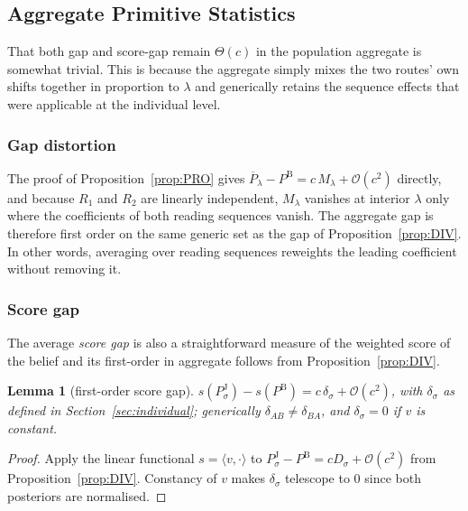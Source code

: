 \documentclass[a4paper,fleqn]{cas-sc}
\newtheorem{lemma}{Lemma}
\theoremstyle{remark}
\theoremstyle{definition}
\newcommand{\PB}{P^{\mathrm{B}}}
\newcommand{\PJ}{P^{\mathrm{J}}}
\newcommand{\Pbar}{\overline{P}}
\newcommand{\bigO}{\mathcal{O}}
\newcommand{\vv}{v}
\newcommand{\anchor}[1]{}
\begin{document}
\subsection{Aggregate Primitive Statistics}
That both gap and score-gap remain $\Theta(c)$ in the population aggregate is somewhat trivial. This is because the aggregate simply mixes the two routes' own shifts together in proportion to 
$\lambda$ and generically retains the sequence effects that were applicable at the individual level.

\subsubsection{Gap distortion}
\label{sec:distortion}

The proof of Proposition~\ref{prop:PRO} gives $\Pbar_\lambda-\PB=c\,M_\lambda+\bigO(c^{2})$ directly, and because $R_1$ and $R_2$ are linearly independent, $M_\lambda$ vanishes at interior $\lambda$ only where the coefficients of both reading sequences vanish. The aggregate gap is therefore first order on the same generic set as the gap of Proposition~\ref{prop:DIV}. In other words, averaging over reading sequences reweights the leading coefficient without removing it. \anchor{Prop.~PRO}

\subsubsection{Score gap}
\label{sec:scoregap}

The average \emph{score gap} is also a straightforward measure of the weighted score of the belief and its first-order in aggregate follows from Proposition~\ref{prop:DIV}.

\renewcommand{\thelemma}{SCR}%
\begin{lemma}[first-order score gap]\label{lem:SCR}
$s(\PJ_\sigma)-s(\PB)=c\,\delta_\sigma+\bigO(c^{2})$, with $\delta_\sigma$ as defined in
Section~\ref{sec:individual}; generically
$\delta_{AB}\neq\delta_{BA}$, and $\delta_\sigma=0$ if $\vv$ is constant. \anchor{Lem.~SCR}
\end{lemma}

\begin{proof}
Apply the linear functional $s=\langle\vv,\cdot\rangle$ to
$\PJ_\sigma-\PB=cD_\sigma+\bigO(c^2)$ from Proposition~\ref{prop:DIV}. Constancy of $\vv$ makes
$\delta_\sigma$ telescope to $0$ since both posteriors are normalised.
\end{proof}
\end{document}
